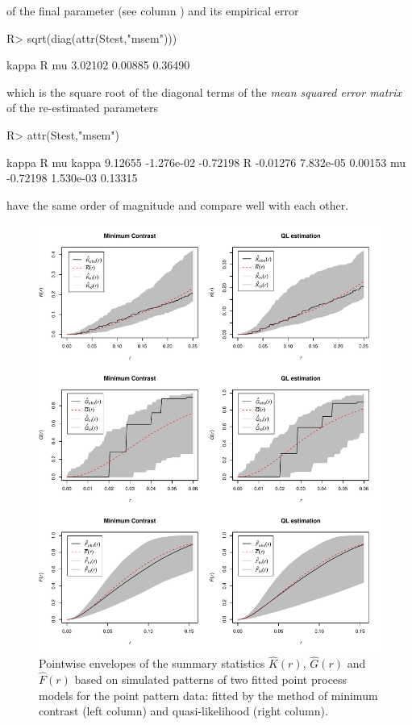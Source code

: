 \documentclass[article, nojss]{jss}
\numberwithin{equation}{section}			%
\begin{document}
of the final parameter (see column ) and its empirical error
\begin{Schunk}
\begin{Sinput}
R> sqrt(diag(attr(Stest,"msem")))
\end{Sinput}
\begin{Soutput}
  kappa       R      mu 
3.02102 0.00885 0.36490 
\end{Soutput}
\end{Schunk}
which is the square root of the diagonal terms of the \emph{mean squared error
matrix} of the re-estimated parameters
\begin{Schunk}
\begin{Sinput}
R> attr(Stest,"msem")
\end{Sinput}
\begin{Soutput}
         kappa          R       mu
kappa  9.12655 -1.276e-02 -0.72198
R     -0.01276  7.832e-05  0.00153
mu    -0.72198  1.530e-03  0.13315
\end{Soutput}
\end{Schunk}
have the same order of magnitude and compare well with each other.\par
%
\begin{figure}[ht!]
\centering
  \includegraphics{Kfunc.pdf}
  \caption{Pointwise envelopes of the summary statistics $\hat{K}(r)$, $\hat{G}(r)$ and $\hat{F}(r)$
  based on simulated patterns of two fitted point process models for the
   point pattern data: fitted by the method of minimum contrast
  (left column) and quasi-likelihood (right column).}
\label{fig:matclust}
\end{figure}
\end{document}
